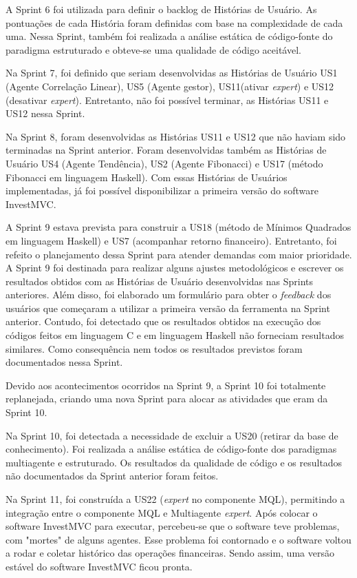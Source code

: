 A Sprint 6 foi utilizada para definir o backlog de Histórias de Usuário. As pontuações de cada História foram definidas com base na complexidade de cada uma. Nessa Sprint, também foi realizada a análise estática de código-fonte do paradigma estruturado e obteve-se uma qualidade de código aceitável.

Na Sprint 7, foi definido que seriam desenvolvidas as Histórias de Usuário US1 (Agente Correlação Linear), US5 (Agente gestor), US11(ativar \textit{expert}) e US12 (desativar \textit{expert}). Entretanto, não foi possível terminar, as Histórias US11 e US12 nessa Sprint.

Na Sprint 8, foram desenvolvidas as Histórias US11 e US12 que não haviam sido terminadas na Sprint anterior. Foram desenvolvidas também as Histórias de Usuário US4 (Agente Tendência), US2 (Agente Fibonacci) e US17 (método Fibonacci em linguagem Haskell). Com essas Histórias de Usuários implementadas, já foi possível disponibilizar a primeira versão do software InvestMVC.

A Sprint 9 estava prevista para construir a US18 (método de Mínimos Quadrados em linguagem Haskell) e US7 (acompanhar retorno financeiro). Entretanto, foi refeito o planejamento dessa Sprint para atender demandas com maior prioridade. A Sprint 9 foi destinada para realizar alguns ajustes metodológicos e escrever os resultados obtidos com as Histórias de Usuário desenvolvidas nas Sprints anteriores. Além disso, foi elaborado um formulário para obter o \textit{feedback} dos usuários que começaram a utilizar a primeira versão da ferramenta na Sprint anterior. Contudo, foi detectado que os resultados obtidos na execução dos códigos feitos em linguagem C e em linguagem Haskell não forneciam resultados similares. Como consequência nem todos os resultados previstos foram documentados nessa Sprint.

Devido aos acontecimentos ocorridos na Sprint 9, a Sprint 10 foi totalmente replanejada, criando uma nova Sprint para alocar as atividades que eram da Sprint 10.

Na Sprint 10, foi detectada a necessidade de excluir a US20 (retirar da base de conhecimento). Foi realizada a análise estática de código-fonte dos paradigmas multiagente e estruturado. Os resultados da qualidade de código e os resultados não documentados da Sprint anterior foram feitos.

Na Sprint 11, foi construída a US22 (\textit{expert} no componente MQL), permitindo a integração entre o componente MQL e Multiagente \textit{expert}. Após colocar o software InvestMVC para executar, percebeu-se que o software teve problemas, com "mortes" de alguns agentes. Esse problema foi contornado e o software voltou a rodar e coletar histórico das operações financeiras. Sendo assim, uma versão estável do software InvestMVC ficou pronta.

